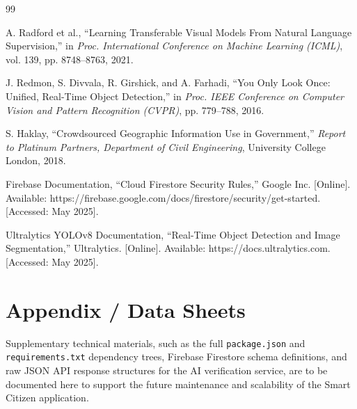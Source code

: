 \documentclass[12pt,a4paper]{report}
\renewcommand{\bibname}{BIBLIOGRAPHY}
\begin{document}
\renewcommand{\bibname}{BIBLIOGRAPHY}
\begin{thebibliography}{99}

A. Radford et al., ``Learning Transferable Visual Models From Natural Language Supervision,'' in \textit{Proc. International Conference on Machine Learning (ICML)}, vol. 139, pp. 8748--8763, 2021.

J. Redmon, S. Divvala, R. Girshick, and A. Farhadi, ``You Only Look Once: Unified, Real-Time Object Detection,'' in \textit{Proc. IEEE Conference on Computer Vision and Pattern Recognition (CVPR)}, pp. 779--788, 2016.

S. Haklay, ``Crowdsourced Geographic Information Use in Government,'' \textit{Report to Platinum Partners, Department of Civil Engineering}, University College London, 2018.

Firebase Documentation, ``Cloud Firestore Security Rules,'' Google Inc. [Online]. Available: https://firebase.google.com/docs/firestore/security/get-started. [Accessed: May 2025].

Ultralytics YOLOv8 Documentation, ``Real-Time Object Detection and Image Segmentation,'' Ultralytics. [Online]. Available: https://docs.ultralytics.com. [Accessed: May 2025].

\end{thebibliography}

\appendix
\chapter{Appendix / Data Sheets}
Supplementary technical materials, such as the full \texttt{package.json} and \texttt{requirements.txt} dependency trees, Firebase Firestore schema definitions, and raw JSON API response structures for the AI verification service, are to be documented here to support the future maintenance and scalability of the Smart Citizen application.
\end{document}
